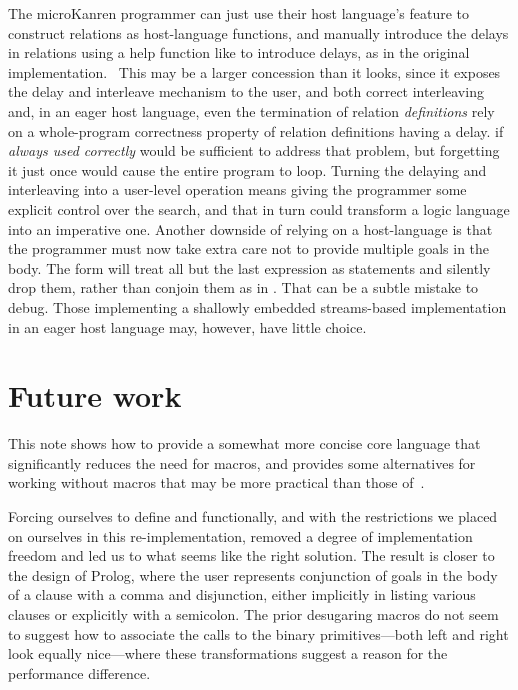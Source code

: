 \documentclass[sigplan,balance,pbalance,natbib=false]{acmart}
\begin{document}
The microKanren programmer can just use their host
language's  feature to construct relations as
host-language functions, and manually introduce the delays in
relations using a help function like  to introduce
delays, as in the original implementation.~\cite{hemann2013muKanren}
This may be a larger concession than it looks, since it exposes the
delay and interleave mechanism to the user, and both correct
interleaving and, in an eager host language, even the termination of
relation \emph{definitions} rely on a whole-program correctness
property of relation definitions having a delay.  if
\emph{always used correctly} would be sufficient to address that
problem, but forgetting it just once would cause the entire program to
loop. Turning the delaying and interleaving into a user-level
operation means giving the programmer some explicit control over the
search, and that in turn could transform a logic language into an
imperative one. Another downside of relying on a
host-language  is that the programmer must now take
extra care not to provide multiple goals in the body.
The  form will treat all but the last expression as
statements and silently drop them, rather than conjoin them as
in . That can be a subtle mistake to debug. Those
implementing a shallowly embedded streams-based implementation in an
eager host language may, however, have little choice.

\section{Future work}\label{sec:conclusion}

This note shows how to provide a somewhat more concise core language
that significantly reduces the need for macros, and provides some
alternatives for working without macros that may be more practical
than those of~\citeauthor{hemann2013muKanren}.

Forcing ourselves to define  and 
functionally, and with the restrictions we placed on ourselves in this
re-implementation, removed a degree of implementation freedom and led
us to what seems like the right solution. The result is closer to the
design of Prolog, where the user represents conjunction of goals in
the body of a clause with a comma and disjunction, either implicitly
in listing various clauses or explicitly with a semicolon. The prior
desugaring macros do not seem to suggest how to associate the calls to
the binary primitives---both left and right look equally nice---where
these transformations suggest a reason for the performance difference.
\end{document}
